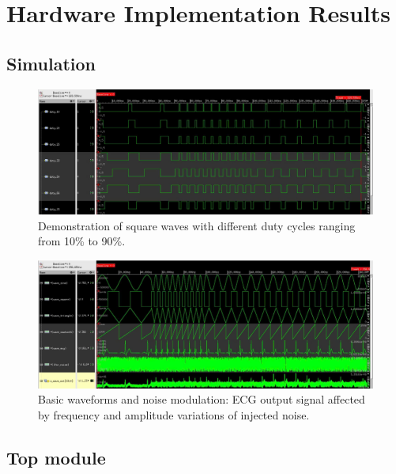\section{Hardware Implementation Results}

\subsection{Simulation}

\begin{figure}[H]
	\centering
	\includegraphics[width=.9\linewidth]{./my-chapters/my-images/simulation/duty_cycle.jpg}
	\caption{Demonstration of square waves with different duty cycles ranging from 10\% to 90\%.}
\end{figure}

\begin{figure}[H]
	\centering
	\includegraphics[width=.9\linewidth]{./my-chapters/my-images/simulation/waveform_with_noise.jpg}
	\caption{Basic waveforms and noise modulation: ECG output signal affected by frequency and amplitude variations of injected noise.}
\end{figure}

\subsection{Top module}

